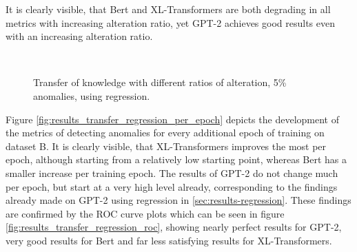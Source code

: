 It is clearly visible, that Bert and XL-Transformers are both degrading in all metrics with increasing alteration ratio, yet GPT-2 achieves good results even with an increasing alteration ratio.

\begin{comment}
\begin{figure}[h]
  \centering
  \texttt{[image: results/transfer/transfer\_regression\_reverse.png]}\\
  \caption{Scores for detecting reversed order of log events for transfer learning, using regression.}
  \label{fig:regression_transfer_reverse}
\end{figure}
\end{comment}

\begin{figure*}[ht!]
  \centering
  \captionsetup{justification=centering}
\hspace{\fill}
\hspace{\fill}
   \\
\caption{\label{fig:results_transfer_regression}Transfer of knowledge with different ratios of alteration, 5\% anomalies, using regression.}
\end{figure*}


Figure \ref{fig:results_transfer_regression_per_epoch} depicts the development of the metrics of detecting anomalies for every additional epoch of training on dataset B. It is clearly visible, that XL-Transformers improves the most per epoch, although starting from a relatively low starting point, whereas Bert has a smaller increase per training epoch. The results of GPT-2 do not change much per epoch, but start at a very high level already, corresponding to the findings already made on GPT-2 using regression in \ref{sec:results-regression}. 
These findings are confirmed by the ROC curve plots which can be seen in figure \ref{fig:results_transfer_regression_roc}, showing nearly perfect results for GPT-2, very good results for Bert and far less satisfying results for XL-Transformers.

